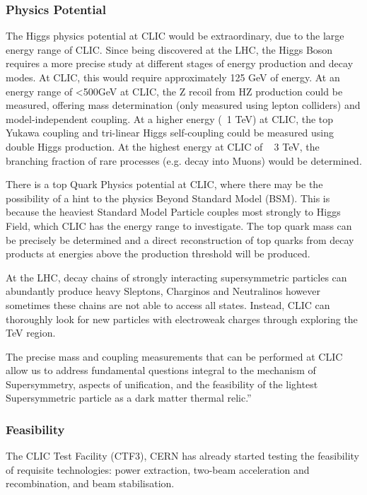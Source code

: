 \subsubsection{Physics Potential}
 
The Higgs physics potential at CLIC would be extraordinary, due to the large energy range of CLIC. Since being discovered at the LHC, the Higgs Boson requires a more precise study at different stages of energy production and decay modes. At CLIC, this would require approximately 125 GeV of energy. At an energy range of <500GeV at CLIC, the Z recoil from HZ production could be measured, offering mass determination (only measured using lepton colliders) and model-independent coupling. At a higher energy (~1 TeV) at CLIC, the top Yukawa coupling and tri-linear Higgs self-coupling could be measured using double Higgs production.
At the highest energy at CLIC of ~ 3 TeV, the branching fraction of rare processes (e.g. decay into Muons) would be determined.
 
There is a top Quark Physics potential at CLIC, where there may be the possibility of a hint to the physics Beyond Standard Model (BSM). This is because the heaviest Standard Model Particle couples most strongly to Higgs Field, which CLIC has the energy range to investigate. The top quark mass can be precisely be determined and a direct reconstruction of top quarks from decay products at energies above the production threshold will be produced.
 
At the LHC, decay chains of strongly interacting supersymmetric particles can abundantly produce heavy Sleptons, Charginos and Neutralinos however sometimes these chains are not able to access all states. Instead, CLIC can thoroughly look for new particles with electroweak charges through exploring the TeV region. \cite{CLIC:Concept}

The precise mass and coupling measurements that can be performed at CLIC allow us to address fundamental questions integral to the mechanism of Supersymmetry, aspects of unification, and the feasibility of the lightest Supersymmetric particle as a dark matter thermal relic.” \cite{CLIC:Concept}
 
\subsubsection{Feasibility}

The CLIC Test Facility (CTF3), CERN has already started testing the feasibility of requisite technologies: power extraction, two-beam acceleration and recombination, and beam stabilisation. \cite{CLIC:DriveBeam}

